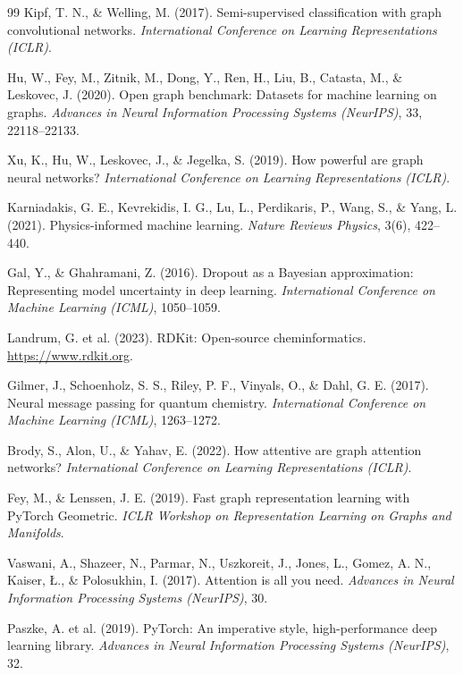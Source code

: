 \documentclass[10pt,twocolumn]{article}
\begin{document}
\begin{thebibliography}{99}
 Kipf, T. N., \& Welling, M. (2017). Semi-supervised classification with graph convolutional networks. \textit{International Conference on Learning Representations (ICLR)}.

 Hu, W., Fey, M., Zitnik, M., Dong, Y., Ren, H., Liu, B., Catasta, M., \& Leskovec, J. (2020). Open graph benchmark: Datasets for machine learning on graphs. \textit{Advances in Neural Information Processing Systems (NeurIPS)}, 33, 22118--22133.

 Xu, K., Hu, W., Leskovec, J., \& Jegelka, S. (2019). How powerful are graph neural networks? \textit{International Conference on Learning Representations (ICLR)}.

 Karniadakis, G. E., Kevrekidis, I. G., Lu, L., Perdikaris, P., Wang, S., \& Yang, L. (2021). Physics-informed machine learning. \textit{Nature Reviews Physics}, 3(6), 422--440.

 Gal, Y., \& Ghahramani, Z. (2016). Dropout as a Bayesian approximation: Representing model uncertainty in deep learning. \textit{International Conference on Machine Learning (ICML)}, 1050--1059.

 Landrum, G. et al. (2023). RDKit: Open-source cheminformatics. \url{https://www.rdkit.org}.

 Gilmer, J., Schoenholz, S. S., Riley, P. F., Vinyals, O., \& Dahl, G. E. (2017). Neural message passing for quantum chemistry. \textit{International Conference on Machine Learning (ICML)}, 1263--1272.

 Brody, S., Alon, U., \& Yahav, E. (2022). How attentive are graph attention networks? \textit{International Conference on Learning Representations (ICLR)}.

 Fey, M., \& Lenssen, J. E. (2019). Fast graph representation learning with PyTorch Geometric. \textit{ICLR Workshop on Representation Learning on Graphs and Manifolds}.

 Vaswani, A., Shazeer, N., Parmar, N., Uszkoreit, J., Jones, L., Gomez, A. N., Kaiser, {\L}., \& Polosukhin, I. (2017). Attention is all you need. \textit{Advances in Neural Information Processing Systems (NeurIPS)}, 30.

 Paszke, A. et al. (2019). PyTorch: An imperative style, high-performance deep learning library. \textit{Advances in Neural Information Processing Systems (NeurIPS)}, 32.


\end{thebibliography}
\end{document}
